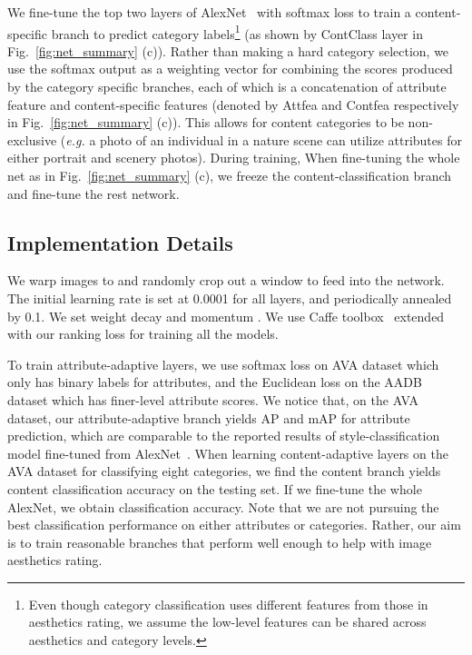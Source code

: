 \documentclass[runningheads]{llncs}
\def\eg{\emph{e.g. }}
\begin{document}
We fine-tune the top two layers of AlexNet~\cite{krizhevsky2012imagenet} with
softmax loss to train a content-specific branch to predict category
labels\footnote{Even though category classification uses different features
from those in aesthetics rating, we assume the low-level features can be shared
across aesthetics and category levels.}
(as shown by ContClass layer in Fig.~\ref{fig:net_summary} (c)).
Rather than making a hard category
selection, we use the softmax output as a weighting vector for combining the
scores produced by the category specific branches, each of which is a
concatenation of attribute feature and content-specific features (denoted by
Attfea and Contfea respectively in Fig.~\ref{fig:net_summary} (c)).
This allows for content
categories to be non-exclusive (\eg a photo of an individual in a nature scene
can utilize attributes for either portrait and scenery photos). During training,
When fine-tuning the whole net as in Fig.~\ref{fig:net_summary} (c),
we freeze the content-classification branch and fine-tune the rest network.

\subsection{Implementation Details}
\label{sec:trainingDetail}
We warp images to  and randomly crop out a  window to feed into the network.
The initial learning rate is set at 0.0001 for all layers,
and periodically annealed by 0.1.
We set weight decay  and momentum .
We use Caffe toolbox~\cite{jia2014caffe} extended with our ranking loss for training all the models.

To train attribute-adaptive layers, we use softmax loss on AVA dataset which only has binary labels for attributes, and
the Euclidean loss on the AADB dataset which has finer-level attribute scores.
We notice that, on the AVA dataset,
our attribute-adaptive branch yields  AP and  mAP for
attribute prediction,
which are comparable to the reported results of style-classification model fine-tuned from AlexNet~\cite{xin2015iccv}.
When learning content-adaptive layers on the AVA dataset for classifying eight categories,
we find the content branch yields  content classification accuracy on the testing set.
If we fine-tune the whole AlexNet,
we obtain  classification accuracy.
Note that we are not pursuing the best classification performance on either attributes or categories.
Rather, our aim is to train reasonable branches that perform well enough to help with image aesthetics rating.
\end{document}
